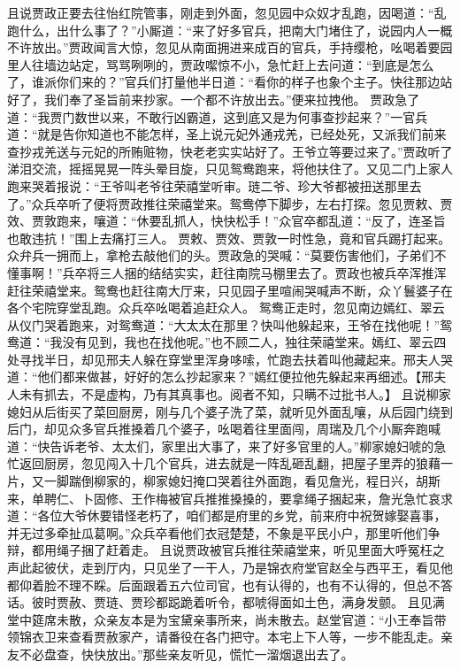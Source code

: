 \documentclass[12pt,oneside]{book}
\begin{document}
且说贾政正要去往怡红院管事，刚走到外面，忽见园中众奴才乱跑，因喝道：“乱跑什么，出什么事了？”小厮道：“来了好多官兵，把南大门堵住了，说园内人一概不许放出。”贾政闻言大惊，忽见从南面拥进来成百的官兵，手持缨枪，吆喝着要园里人往墙边站定，骂骂咧咧的，贾政噄惊不小，急忙赶上去问道：“到底是怎么了，谁派你们来的？”官兵们打量他半日道：“看你的样子也象个主子。快往那边站好了，我们奉了圣旨前来抄家。一个都不许放出去。”便来拉拽他。
贾政急了道：“我贾门数世以来，不敢行凶霸道，这到底又是为何事查抄起来？”一官兵道：“就是告你知道也不能怎样，圣上说元妃外通戎羌，已经处死，又派我们前来查抄戎羌送与元妃的所贿赃物，快老老实实站好了。王爷立等要过来了。”贾政听了涕泪交流，摇摇晃晃一阵头晕目旋，只见鸳鸯跑来，将他扶住了。又见二门上家人跑来哭着报说：“王爷叫老爷往荣禧堂听审。琏二爷、珍大爷都被扭送那里去了。”众兵卒听了便将贾政推往荣禧堂来。鸳鸯停下脚步，左右打探。忽见贾敕、贾效、贾敦跑来，嚷道：“休要乱抓人，快快松手！”众官卒都乱道：“反了，连圣旨也敢违抗！”围上去痛打三人。
贾敕、贾效、贾敦一时性急，竟和官兵踢打起来。众弁兵一拥而上，拿枪去敲他们的头。贾政急的哭喊：“莫要伤害他们，子弟们不懂事啊！”兵卒将三人捆的结结实实，赶往南院马棚里去了。贾政也被兵卒浑推浑赶往荣禧堂来。鸳鸯也赶往南大厅来，只见园子里喧闹哭喊声不断，众丫鬟婆子在各个宅院穿堂乱跑。众兵卒吆喝着追赶众人。
鸳鸯正走时，忽见南边嫣红、翠云从仪门哭着跑来，对鸳鸯道：“大太太在那里？快叫他躲起来，王爷在找他呢！”鸳鸯道：“我没有见到，我也在找他呢。”也不顾二人，独往荣禧堂来。嫣红、翠云四处寻找半日，却见邢夫人躲在穿堂里浑身哆嗦，忙跑去扶着叫他藏起来。邢夫人哭道：“他们都来做甚，好好的怎么抄起家来？”嫣红便拉他先躲起来再细述。【邢夫人未有抓去，不是虚构，乃有其真事也。阅者不知，只瞒不过批书人。】
且说柳家媳妇从后街买了菜回厨房，刚与几个婆子洗了菜，就听见外面乱嚷，从后园门绕到后门，却见众多官兵推搡着几个婆子，吆喝着往里面闯，周瑞及几个小厮奔跑喊道：“快告诉老爷、太太们，家里出大事了，来了好多官里的人。”柳家媳妇唬的急忙返回厨房，忽见闯入十几个官兵，进去就是一阵乱砸乱翻，把屋子里弄的狼藉一片，又一脚踹倒柳家的，柳家媳妇掩口哭着往外面跑，看见詹光，程日兴，胡斯来，单聘仁、卜固修、王作梅被官兵推推搡搡的，要拿绳子捆起来，詹光急忙哀求道：“各位大爷休要错怪老朽了，咱们都是府里的乡党，前来府中祝贺嫁娶喜事，并无过多牵扯瓜葛啊。”众兵卒看他们衣冠楚楚，不象是平民小户，那里听他们争辩，都用绳子捆了赶着走。
且说贾政被官兵推往荣禧堂来，听见里面大呼冤枉之声此起彼伏，走到厅内，只见坐了一干人，乃是锦衣府堂官赵全与西平王，看见他都仰着脸不理不睬。后面跟着五六位司官，也有认得的，也有不认得的，但总不答话。彼时贾赦、贾琏、贾珍都跽跪着听令，都唬得面如土色，满身发颤。
且见满堂中筵席未散，众亲友本是为宝黛亲事所来，尚未散去。赵堂官道：“小王奉旨带领锦衣卫来查看贾赦家产，请番役在各门把守。本宅上下人等，一步不能乱走。亲友不必盘查，快快放出。”那些亲友听见，慌忙一溜烟退出去了。
\end{document}
